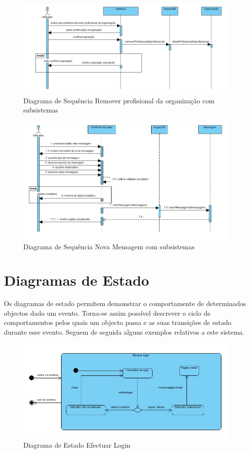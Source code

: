 ﻿\documentclass[12pt,a4paper]{article}
\begin{document}
\begin{figure}[h!]
\centering
\includegraphics[scale=0.7]{sequencia/est_removerprofissional}
\caption{Diagrama de Sequência Remover profisional da organização com subsistemas} 
\end{figure}  

\begin{figure}[h!]
\centering
\includegraphics[scale=0.7]{sequencia/est_novamensagem}
\caption{Diagrama de Sequência Nova Mensagem com subsistemas} 
\end{figure}

\clearpage

\section{Diagramas de Estado}
Os diagramas de estado permitem demonstrar o comportamente de determinados objectos dado um evento. Torna-se assim possível descrever o ciclo de comportamentos pelos quais um objecto passa e as suas transições de estado durante esse evento. Seguem de seguida alguns exemplos relativos a este sistema.\\

\begin{figure}[h!]
\centering
\includegraphics[scale=0.7]{estado/login}
\caption{Diagrama de Estado Efectuar Login} 
\end{figure} 
\end{document}
